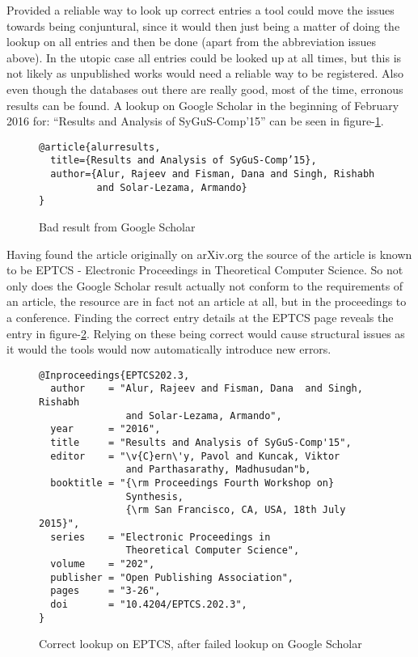 
Provided a reliable way to look up correct entries a tool could move
the issues towards being conjuntural, since it would then just being a
matter of doing the lookup on all entries and then be done (apart from
the abbreviation issues above).  In the utopic case all entries could
be looked up at all times, but this is not likely as unpublished works
would need a reliable way to be registered.  Also even though the
databases out there are really good, most of the time, erronous
results can be found.  A lookup on Google Scholar in the beginning of
February 2016 for: ``Results and Analysis of SyGuS-Comp’15'' can be
seen in figure-\ref{fig:scholar_bad_result}.

\begin{figure}[ht]
  \centering
\begin{verbatim}
@article{alurresults,
  title={Results and Analysis of SyGuS-Comp’15},
  author={Alur, Rajeev and Fisman, Dana and Singh, Rishabh
          and Solar-Lezama, Armando}
}
\end{verbatim}
  \caption{Bad result from Google Scholar}
\label{fig:scholar_bad_result}
\end{figure}

Having found the article originally on arXiv.org the source of the
article is known to be EPTCS - Electronic Proceedings in Theoretical
Computer Science.  So not only does the Google Scholar result actually
not conform to the requirements of an article, the resource are in
fact not an article at all, but in the proceedings to a conference.
Finding the correct entry details at the EPTCS page reveals the entry
in figure-\ref{fig:eptcs_lookup}.  Relying on these being correct
would cause structural issues as it would the tools would now
automatically introduce new errors.

\begin{figure}[ht]
  \centering
\begin{small}
\begin{verbatim}
@Inproceedings{EPTCS202.3,
  author    = "Alur, Rajeev and Fisman, Dana  and Singh, Rishabh 
               and Solar-Lezama, Armando",
  year      = "2016",
  title     = "Results and Analysis of SyGuS-Comp'15",
  editor    = "\v{C}ern\'y, Pavol and Kuncak, Viktor 
               and Parthasarathy, Madhusudan"b,
  booktitle = "{\rm Proceedings Fourth Workshop on}
               Synthesis,
               {\rm San Francisco, CA, USA, 18th July 2015}",
  series    = "Electronic Proceedings in 
               Theoretical Computer Science",
  volume    = "202",
  publisher = "Open Publishing Association",
  pages     = "3-26",
  doi       = "10.4204/EPTCS.202.3",
}
\end{verbatim}
\end{small}
  \caption{Correct lookup on EPTCS, after failed lookup on Google Scholar}
\label{fig:eptcs_lookup}
\end{figure}

